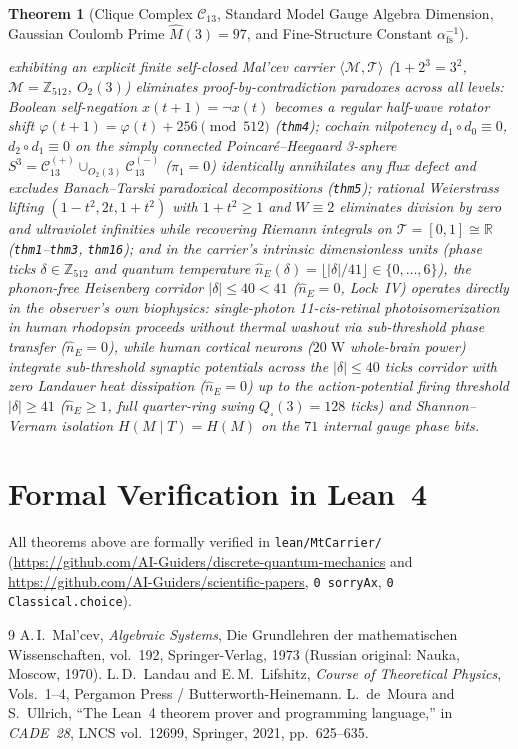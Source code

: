 \documentclass[11pt,a4paper]{article}
\theoremstyle{plain}
\newtheorem{theorem}{Theorem}[section]
\theoremstyle{definition}
\begin{document}
\begin{theorem}[Clique Complex $\mathcal{C}_{13}$, Standard Model Gauge Algebra Dimension, Gaussian Coulomb Prime $\hat{M}(3)=97$, and Fine-Structure Constant $\alpha_{\mathrm{fs}}^{-1}$]
\begin{enumerate}[label=\textbf{(\roman*)},leftmargin=*]
  exhibiting an explicit finite self-closed Mal'cev carrier $\langle\mathcal{M},\mathcal{T}\rangle$ ($1+2^3=3^2$, $\mathcal{M}=\mathbb{Z}_{512}$, $O_2(3)$) eliminates proof-by-contradiction paradoxes across all levels: Boolean self-negation $x(t+1)=\neg x(t)$ becomes a regular half-wave rotator shift $\varphi(t+1)=\varphi(t)+256\pmod{512}$ (\texttt{thm4}); cochain nilpotency $d_1\circ d_0\equiv 0$, $d_2\circ d_1\equiv 0$ on the simply connected Poincaré--Heegaard 3-sphere $S^3 = \mathcal{C}_{13}^{(+)}\cup_{O_2(3)}\mathcal{C}_{13}^{(-)}$ ($\pi_1=0$) identically annihilates any flux defect and excludes Banach--Tarski paradoxical decompositions (\texttt{thm5}); rational Weierstrass lifting $(1-t^2,2t,1+t^2)$ with $1+t^2\ge 1$ and $W\equiv 2$ eliminates division by zero and ultraviolet infinities while recovering Riemann integrals on $\mathcal{T}=[0,1]\cong\mathbb{R}$ (\texttt{thm1}--\texttt{thm3}, \texttt{thm16}); and in the carrier's intrinsic dimensionless units (phase ticks $\delta\in\mathbb{Z}_{512}$ and quantum temperature $\hat{n}_E(\delta) = \lfloor|\delta|/41\rfloor\in\{0,\dots,6\}$), the phonon-free Heisenberg corridor $|\delta|\le 40 < 41$ ($\hat{n}_E=0$, Lock~IV) operates directly in the observer's own biophysics: single-photon 11-\emph{cis}-retinal photoisomerization in human rhodopsin proceeds without thermal washout via sub-threshold phase transfer ($\hat{n}_E=0$), while human cortical neurons ($20\;\text{W}$ whole-brain power) integrate sub-threshold synaptic potentials across the $|\delta|\le 40$ ticks corridor with zero Landauer heat dissipation ($\hat{n}_E=0$) up to the action-potential firing threshold $|\delta|\ge 41$ ($\hat{n}_E\ge 1$, full quarter-ring swing $Q_\square(3)=128$ ticks) and Shannon--Vernam isolation $H(M\mid T)=H(M)$ on the $71$ internal gauge phase bits.
\end{enumerate}
\end{theorem}

\section{Formal Verification in Lean~4}
All theorems above are formally verified in \texttt{lean/MtCarrier/} (\url{https://github.com/AI-Guiders/discrete-quantum-mechanics} and \url{https://github.com/AI-Guiders/scientific-papers}, \texttt{0 sorryAx}, \texttt{0 Classical.choice}).

\begin{thebibliography}{9}
A.\,I.~Mal'cev, \emph{Algebraic Systems}, Die Grundlehren der mathematischen Wissenschaften, vol.~192, Springer-Verlag, 1973 (Russian original: Nauka, Moscow, 1970).
L.\,D.~Landau and E.\,M.~Lifshitz, \emph{Course of Theoretical Physics}, Vols.~1--4, Pergamon Press / Butterworth-Heinemann.
L.~de~Moura and S.~Ullrich, ``The Lean~4 theorem prover and programming language,'' in \emph{CADE~28}, LNCS vol.~12699, Springer, 2021, pp.~625--635.
\end{thebibliography}
\end{document}
